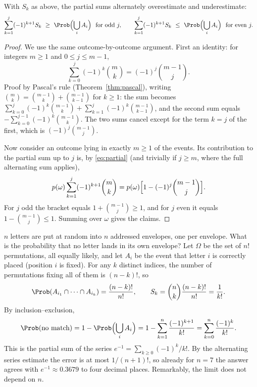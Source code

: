\begin{theorem}\label{thm:bonferroni}
With $S_k$ as above, the partial sums alternately overestimate and
underestimate:
\[
\sum_{k=1}^{j}(-1)^{k+1}S_k\ \ge\ \Prob\Bigl(\bigcup_iA_i\Bigr)\ \text{ for odd } j,
\qquad
\sum_{k=1}^{j}(-1)^{k+1}S_k\ \le\ \Prob\Bigl(\bigcup_iA_i\Bigr)\ \text{ for even } j.
\]
\end{theorem}
\begin{proof}
We use the same outcome-by-outcome argument. First an identity: for
integers $m\ge1$ and $0\le j\le m-1$,
\begin{equation}\label{eq:partial}
\sum_{k=0}^{j}(-1)^k\binom mk=(-1)^j\binom{m-1}{j}.
\end{equation}
Proof by Pascal's rule (Theorem~\ref{thm:pascal}), writing
$\binom mk=\binom{m-1}k+\binom{m-1}{k-1}$ for $k\ge 1$: the sum becomes
$\sum_{k=0}^j(-1)^k\binom{m-1}k+\sum_{k=1}^j(-1)^k\binom{m-1}{k-1}$, and the
second sum equals $-\sum_{k=0}^{j-1}(-1)^k\binom{m-1}{k}$. The two sums cancel
except for the term $k=j$ of the first, which is $(-1)^j\binom{m-1}j$.

Now consider an outcome lying in exactly $m\ge 1$ of the events. Its
contribution to the partial sum up to $j$ is, by \eqref{eq:partial} (and
trivially if $j\ge m$, where the full alternating sum applies),
\[
p(\omega)\sum_{k=1}^{j}(-1)^{k+1}\binom mk=p(\omega)\Bigl[1-(-1)^j\binom{m-1}{j}\Bigr].
\]
For $j$ odd the bracket equals $1+\binom{m-1}{j}\ge 1$, and for $j$ even it
equals $1-\binom{m-1}{j}\le1$. Summing over $\omega$ gives the claims.
\end{proof}

\begin{example}\label{ex:matching}
$n$ letters are put at random into $n$ addressed envelopes, one per envelope.
What is the probability that no letter lands in its own envelope? Let
$\Omega$ be the set of $n!$ permutations, all equally likely, and let $A_i$ be
the event that letter $i$ is correctly placed (position $i$ is fixed). For any
$k$ distinct indices, the number of permutations fixing all of them is
$(n-k)!$, so
\[
\Prob(A_{i_1}\cap\dots\cap A_{i_k})=\frac{(n-k)!}{n!},
\qquad
S_k=\binom nk\frac{(n-k)!}{n!}=\frac1{k!}.
\]
By inclusion--exclusion,
\[
\Prob(\text{no match})=1-\Prob\Bigl(\bigcup_iA_i\Bigr)
=1-\sum_{k=1}^n\frac{(-1)^{k+1}}{k!}=\sum_{k=0}^n\frac{(-1)^k}{k!}.
\]
This is the partial sum of the series $e^{-1}=\sum_{k\ge 0}(-1)^k/k!$. By the
alternating series estimate the error is at most $1/(n+1)!$, so already for
$n=7$ the answer agrees with $e^{-1}\approx0.3679$ to four decimal places.
Remarkably, the limit does not depend on $n$.
\end{example}


